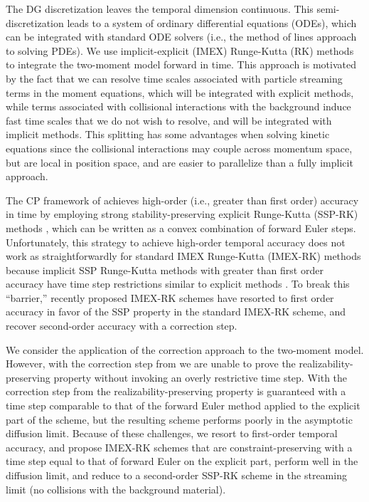 The DG discretization leaves the temporal dimension continuous.  
This semi-discretization leads to a system of ordinary differential equations (ODEs), which can be integrated with standard ODE solvers (i.e., the method of lines approach to solving PDEs).  
We use implicit-explicit (IMEX) Runge-Kutta (RK) methods \cite{ascher_etal_1997,pareschiRusso_2005} to integrate the two-moment model forward in time.  
This approach is motivated by the fact that we can resolve time scales associated with particle streaming terms in the moment equations, which will be integrated with explicit methods, while terms associated with collisional interactions with the background induce fast time scales that we do not wish to resolve, and will be integrated with implicit methods.  
This splitting has some advantages when solving kinetic equations since the collisional interactions may couple across momentum space, but are local in position space, and are easier to parallelize than a fully implicit approach.  

The CP framework of \cite{zhangShu_2010a} achieves high-order (i.e., greater than first order) accuracy in time by employing strong stability-preserving explicit Runge-Kutta (SSP-RK) methods \cite{shuOsher_1988,gottlieb_etal_2001}, which can be written as a convex combination of forward Euler steps.  
Unfortunately, this strategy to achieve high-order temporal accuracy does not work as straightforwardly for standard IMEX Runge-Kutta (IMEX-RK) methods because implicit SSP Runge-Kutta methods with greater than first order accuracy have time step restrictions similar to explicit methods \cite{gottlieb_etal_2001}.  
To break this ``barrier,'' recently proposed IMEX-RK schemes \cite{chertock_etal_2015,hu_etal_2018} have resorted to first order accuracy in favor of the SSP property in the standard IMEX-RK scheme, and recover second-order accuracy with a correction step.  

We consider the application of the correction approach to the two-moment model.  
However, with the correction step from \cite{chertock_etal_2015} we are unable to prove the realizability-preserving property without invoking an overly restrictive time step.  
With the correction step from \cite{hu_etal_2018} the realizability-preserving property is guaranteed with a time step comparable to that of the forward Euler method applied to the explicit part of the scheme, but the resulting scheme performs poorly in the asymptotic diffusion limit.  
Because of these challenges, we resort to first-order temporal accuracy, and propose IMEX-RK schemes that are constraint-preserving with a time step equal to that of forward Euler on the explicit part, perform well in the diffusion limit, and reduce to a second-order SSP-RK scheme in the streaming limit (no collisions with the background material).  

